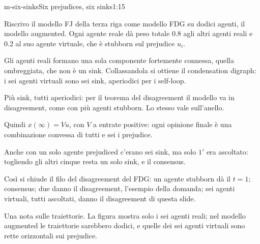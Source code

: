 \begin{slidedue}{m-six-sinks}{Six prejudices, six sinks}{1:15}
  \begin{discorso}
    \item Riscrivo il modello FJ della {\color{red} } {\color{blue}terza riga} come modello FDG su dodici {\color{red}} {\color{blue}agenti, il modello augmented.} Ogni agente reale dà peso totale 0.8 agli altri agenti reali e 0.2 al suo agente virtuale, che è stubborn sul {\color{red}} {\color{blue}prejudice} $u_i$.
    \item Gli agenti reali formano una sola componente fortemente connessa, quella ombreggiata, che non è un sink. Collassandola si ottiene il condensation digraph: i sei agenti virtuali sono sei sink, aperiodici per i self-loop.
    \item {\color{red} } {\color{blue}Più sink, tutti aperiodici: per il teorema del disagreement il modello va in disagreement, come} con {\color{red}         } {\color{blue}più agenti stubborn.} Lo stesso vale sull'anello.
    \item Quindi $x(\infty)=Vu$, con $V$ a entrate positive: ogni opinione finale è una combinazione convessa di tutti e sei i {\color{red}} {\color{blue}prejudice.}
    \item Anche {\color{red}   } {\color{blue}con un solo agente prejudiced c'erano} sei sink, ma solo $1'$ {\color{red}} {\color{blue}era} ascoltato: togliendo gli altri cinque resta un solo sink, e il {\color{red}} {\color{blue}consensus.}
    \item Così si chiude il filo del {\color{red}} {\color{blue}disagreement} del FDG: un agente stubborn dà il {\color{red}    } {\color{red}$t=1$;} {\color{blue}consensus;} due danno il {\color{red}} {\color{blue}disagreement,} l'esempio della domanda; sei agenti virtuali, tutti ascoltati, danno il {\color{red}} {\color{blue}disagreement} di questa slide.
    \item \clic Una nota sulle traiettorie. La {\color{red} } {\color{blue}figura} mostra solo i sei agenti reali; nel modello {\color{red}} {\color{blue}augmented} le traiettorie sarebbero dodici, e quelle dei sei agenti virtuali sono rette orizzontali sui {\color{red}} {\color{blue}prejudice.}

\end{discorso}
\end{slidedue}
